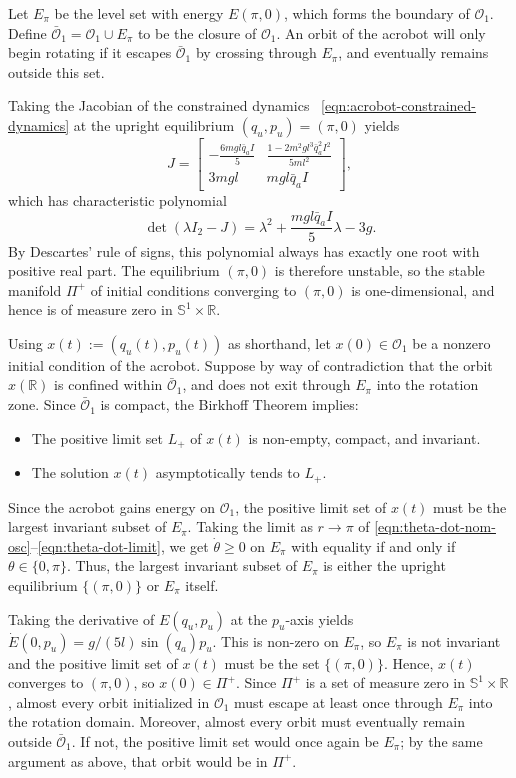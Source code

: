 \documentclass[journal,twoside,web, twocolumn,draftcls]{ieeecolor}
\newcommand*{\R}{\mathbb{R}}
\newcommand*{\Sone}{\mathbb{S}^1}
\newcommand*{\SxR}{\Sone \times \R}
\newcommand*{\Id}[1]{I_{#1}}
\begin{document}
Let \(E_\pi\) be the level set with energy \(E(\pi,0)\), 
which forms the boundary of \(\mathcal{O}_1\). 
Define \(\bar{\mathcal{O}}_1 = \mathcal{O}_1 \cup E_\pi\) to be the closure of
\(\mathcal{O}_1\).
An orbit of the acrobot will only begin rotating if it escapes
\(\bar{\mathcal{O}}_1\) by crossing through \(E_\pi\), and eventually remains
outside this set.

Taking the Jacobian of the constrained dynamics
~\eqref{eqn:acrobot-constrained-dynamics} at the upright equilibrium 
\((q_u,p_u) = (\pi,0)\) yields
\[
    J = \begin{bmatrix}
        -\frac{6mgl\bar{q}_aI}{5} & \frac{1 - 2m^2gl^3\bar{q}_a^2 I^2}{5ml^2} \\
        3mgl & mgl\bar{q}_aI
    \end{bmatrix}
    ,
\]
which has characteristic polynomial
\[
    \det\left(\lambda \Id{2} - J\right)
    = \lambda^2 + \frac{mgl\bar{q}_a I}{5} \lambda - 3g
    .
\]
By Descartes' rule of signs, this polynomial always has exactly one root with
positive real part. 
The equilibrium \((\pi,0)\) is therefore unstable, so the stable manifold
\(\Pi^+\) of initial conditions converging to \((\pi,0)\) is one-dimensional,
and hence is of measure zero in \(\SxR\).

Using \(x(t) := (q_u(t),p_u(t))\) as shorthand, let
\(x(0) \in \mathcal{O}_1\) be a nonzero initial condition of the acrobot.
Suppose by way of contradiction that the orbit \(x(\R)\) is confined within 
\(\bar{\mathcal{O}}_1\), and does not exit through \(E_\pi\) into the rotation
zone.
Since \(\bar{\mathcal{O}}_1\) is compact, the Birkhoff Theorem \cite{birkhoff}
implies:
\begin{itemize}
    \item The positive limit set \(L_+\) of \(x(t)\) is non-empty, compact, and
        invariant.
    \item The solution \(x(t)\) asymptotically tends to \(L_+\).
\end{itemize}
Since the acrobot gains energy on \(\mathcal{O}_1\), the positive limit set of
\(x(t)\) must be the largest invariant subset of \(E_\pi\). 
Taking the limit as \(r \to \pi\) of
\eqref{eqn:theta-dot-nom-osc}--\eqref{eqn:theta-dot-limit},
we get \(\dot{\theta} \geq 0\) on \(E_\pi\) with equality if and only if
\(\theta \in \{0,\pi\}\).
Thus, the largest invariant subset of \(E_\pi\) is either the upright
equilibrium \(\{(\pi,0)\}\) or \(E_\pi\) itself.

Taking the derivative of \(E(q_u,p_u)\) at the \(p_u\)-axis yields
\(\dot{E}(0,p_u) = g/(5l) \sin(q_a)p_u\).
This is non-zero on \(E_\pi\), so \(E_\pi\) is not invariant and the positive
limit set of \(x(t)\) must be the set \(\{(\pi,0)\}\). 
Hence, \(x(t)\) converges to \((\pi,0)\), so \(x(0) \in \Pi^+\).
Since \(\Pi^+\) is a set of measure zero in \(\SxR\), almost every orbit
initialized in \(\mathcal{O}_1\) must escape at least once through \(E_\pi\)
into the rotation domain.
Moreover, almost every orbit must eventually remain outside
\(\bar{\mathcal{O}}_1\).
If not, the positive limit set would once again be
\(E_\pi\); by the same argument as above, that orbit would be in \(\Pi^+\).
\end{document}
